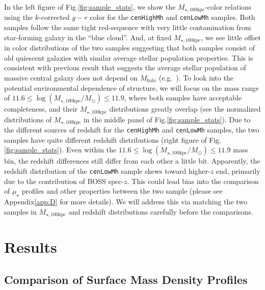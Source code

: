 \documentclass{emulateapj}
\def\rbcg{\texttt{cenHighMh}}
\def\nbcg{\texttt{cenLowMh}}
\def\mhalo{{$M_{\mathrm{halo}}$}}
\def\mtot{{$M_{\star,100\mathrm{kpc}}$}}
\def\logmtot{{$\log (M_{\star,100\mathrm{kpc}}/M_{\odot})$}}
\def\mden{{$\mu_{\star}$}}
\begin{document}
\begin{CJK*}{UTF8}{gbsn}
    In the left figure of Fig.\ref{fig:sample_stats}, we show the \mtot{}-color 
    relations using the $k$-corrected $g-r$ color for the \rbcg{} and \nbcg{} 
    samples. 
    Both samples follow the same tight red-sequence with very little contamination 
    from star-forming galaxy in the ``blue cloud''.
    And, at fixed \mtot{}, we see little offset in color distributions of the two 
    samples suggesting that both samples consist of old quiescent galaxies with 
    similar average stellar population properties.  
    This is consistent with previous result that suggests the average stellar 
    population of massive central galaxy does not depend on \mhalo{} 
    (e.g.\ \citealt{Park2007}).  
    To look into the potential environmental dependence of structure, we will 
    focus on the mass range of $11.6 \le$\logmtot{}$\le 11.9$, where both samples 
    have acceptable completeness, and their \mtot{} distributions greatly overlap
    (see the normalized distributions of \mtot{} in the middle panel of 
    Fig.\ref{fig:sample_stats}). 
    Due to the different sources of redshift for the \rbcg{} and \nbcg{} samples, 
    the two samples have quite different redshift distributions 
    (right figure of Fig.\ref{fig:sample_stats}).
    Even within the $11.6 \le$\logmtot{}$\le 11.9$ mass bin, the redshift
    differences still differ from each other a little bit.  
    Apparently, the redshift distribution of the \nbcg{} sample skews toward 
    higher-$z$ end, primarily due to the contribution of BOSS spec-$z$.
    This could lead bias into the comparison of \mden{} profiles and other 
    properties between the two sample (please see Appendix\ref{app:D} for more 
    details).  
    We will address this via matching the two samples in \mtot{} and redshift
    distributions carefully before the comparisons.


\section{Results}
    \label{sec:result}
    
\subsection{Comparison of Surface Mass Density Profiles}
    \label{ssec:sbp_compare}


\end{CJK*}
\end{document}
